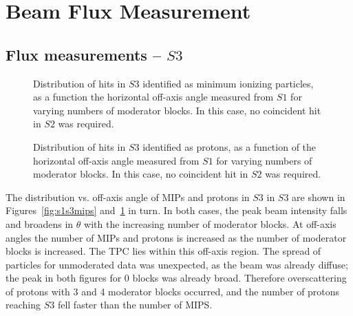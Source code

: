\section{Beam Flux Measurement}
\label{hptpcPaper:sec:Results}

\subsection{Flux measurements -- $\mathit{S3}$}

\begin{figure}[h]
  \begin{minipage}{0.48\textwidth}
    \begin{adjustbox}{max totalsize={\textwidth}{.35\textheight},center}
      
    \end{adjustbox}
    \caption{Distribution of hits in $\mathit{S3}$ identified as minimum ionizing particles, as a function the horizontal off-axis angle measured from $\mathit{S1}$ for varying numbers of moderator blocks. In this case, no coincident hit in $\mathit{S2}$ was required.}
    \label{fig:s1s3mips}
  \end{minipage}
  \hspace{0.3cm}
  \begin{minipage}{0.48\textwidth}
    \begin{adjustbox}{max totalsize={\textwidth}{.35\textheight},center}
      
    \end{adjustbox}
    \caption{Distribution of hits in $\mathit{S3}$ identified as protons, as a function of the horizontal off-axis angle measured from $\mathit{S1}$ for varying numbers of moderator blocks. In this case, no coincident hit in $\mathit{S2}$ was required.}
    \label{fig:s1s3protons}
  \end{minipage}
\end{figure}

The distribution vs. off-axis angle of MIPs and protons in $\mathit{S3}$ in $\mathit{S3}$ are shown in Figures~\ref{fig:s1s3mips} and~\ref{fig:s1s3protons} in turn. 
In both cases, the peak beam intensity falls and broadens in $\theta$ with the increasing number of moderator blocks. 
At off-axis angles the number of MIPs and protons is increased as the number of moderator blocks is increased.
The TPC lies within this off-axis region.
The spread of particles for unmoderated data was unexpected, as the beam was already diffuse; the peak in both figures for 0 blocks was already broad.
Therefore overscattering of protons with 3 and 4 moderator blocks occurred, and the number of protons reaching $\mathit{S3}$ fell faster than the number of MIPS.

